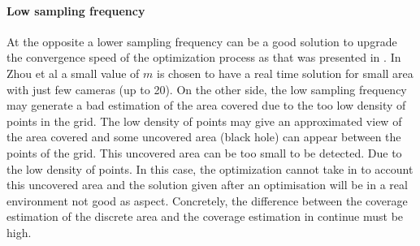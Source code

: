 \paragraph*{Low sampling frequency}
At the opposite a lower sampling frequency can be a good solution to upgrade the convergence speed of the optimization process as that was presented in \cite{8*zhou2011}. In Zhou et al \cite{8*zhou2011} a small value of $m$ is chosen to have a real time solution for small area with just few cameras (up to  20). 
On the other side, the low sampling frequency may generate a bad estimation of the area covered due to the too low density of points in the grid. The low density of points may give an approximated view of the area covered and some uncovered area (black hole) can appear between the points of the grid. This uncovered area can be too small to be detected. Due to the low density of points. In this case, the optimization cannot take in to account this uncovered area and the solution given after an optimisation will be in a real environment not good as aspect. Concretely, the difference between the coverage estimation of the discrete area and the  coverage estimation in continue must be high.    \\





